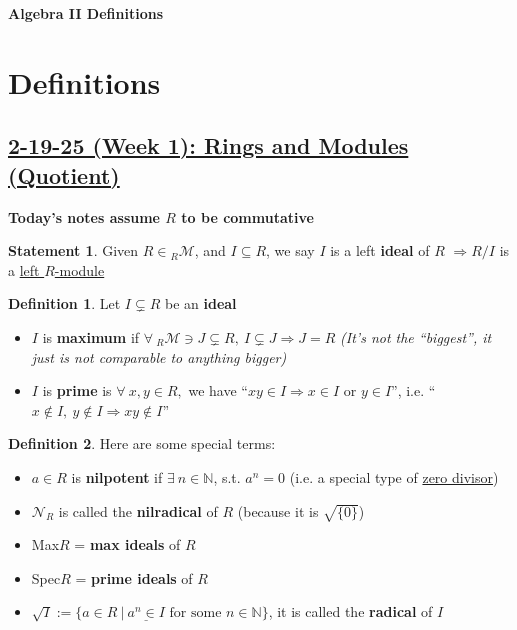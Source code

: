 \documentclass[12pt,a4paper]{article}
\theoremstyle{definition}
\newtheorem{definition}{Definition}[subsection]
\newtheorem{statement}{Statement}[subsection]
\begin{document}
\begin{center}
  {\Large \bf Algebra II Definitions}\\[6pt]
\end{center}

\section*{Definitions}
\setcounter{definition}{0}
\setcounter{statement}{0}
\subsection*{\underline{\textbf{2-19-25 (Week 1): Rings and Modules (Quotient)}}}
\textbf{Today's notes assume $R$ to be commutative}
\begin{statement}
  Given $R \in\text{}_R\mathcal{M}$, and $I \subseteq R$, we say $I$ is a left \textbf{ideal} of $R$ $\Rightarrow \boxed{R/I}$ is a \underline{left $R$-module}
\end{statement}
\vspace{0.125em}

\begin{definition}
Let $I \subsetneq R$ be an \textbf{ideal}
  \begin{itemize}
    \item $I$ is \textbf{maximum} if $\forall\ \text{}_R\mathcal{M} \ni J \subsetneq R,\ I \subsetneq J \Rightarrow J = R$ \textit{(It's not the ``biggest'', it just is not comparable to anything bigger)}
    \item $I$ is \textbf{prime} is $\forall\ x, y \in R,$ we have ``$xy \in I \Rightarrow x \in I \text{ or } y \in I$'', i.e. ``$x \notin I,\ y \notin I \Rightarrow xy \notin I$''
  \end{itemize}
\end{definition}
\vspace{0.125em}

\begin{definition}
  Here are some special terms:
  \begin{itemize}
    \item $a \in R$ is \textbf{nilpotent} if $\exists\ n \in \mathbb{N}$, s.t. $a^n = 0$ (i.e. a special type of \underline{zero divisor})
    \item $\mathcal{N}_R$ is called the \textbf{nilradical} of $R$ (because it is $\sqrt{\{0\}}$)
    \item Max$R$ = {\textbf{max ideals} of $R$}
    \item Spec$R$ = {\textbf{prime ideals} of $R$}
    \item $\sqrt{I} := \{a \in R \ | \ \underline{a^n \in I} \text{ for some } n \in \mathbb{N}\}$, it is called the \textbf{radical} of $I$
  \end{itemize}
\end{definition}
\vspace{0.125em}
\end{document}

